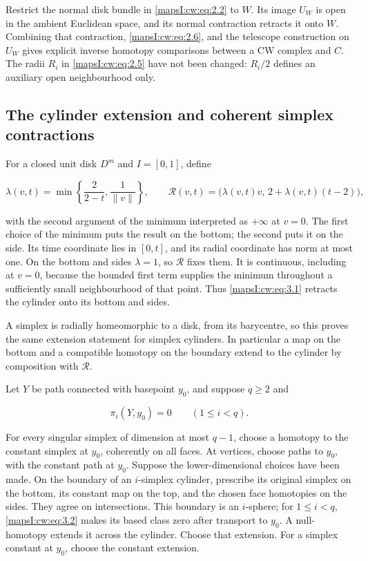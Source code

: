 \documentclass[11pt]{article}
\begin{document}
Restrict the normal disk bundle in \eqref{mapsI:cw:eq:2.2} to \(W\). Its image \(U_W\) is open in the ambient Euclidean space, and its normal contraction retracts it onto \(W\). Combining that contraction, \eqref{mapsI:cw:eq:2.6}, and the telescope construction on \(U_W\) gives explicit inverse homotopy comparisons between a CW complex and \(C\). The radii \(R_i\) in \eqref{mapsI:cw:eq:2.5} have not been changed: \(R_i/2\) defines an auxiliary open neighbourhood only.

\subsection{The cylinder extension and coherent simplex contractions}
\label{mapsI:cw:hurewicz-coherent}

For a closed unit disk \(D^m\) and \(I=[0,1]\), define

\begin{equation}
\lambda(v,t)=\min\left\{\frac{2}{2-t},\frac1{\lVert v\rVert}\right\},
\qquad
\mathcal R(v,t)=\bigl(\lambda(v,t)v,\,2+\lambda(v,t)(t-2)\bigr),
\label{mapsI:cw:eq:3.1}
\end{equation}

with the second argument of the minimum interpreted as \(+\infty\) at \(v=0\). The first choice of the minimum puts the result on the bottom; the second puts it on the side. Its time coordinate lies in \([0,t]\), and its radial coordinate has norm at most one. On the bottom and sides \(\lambda=1\), so \(\mathcal R\) fixes them. It is continuous, including at \(v=0\), because the bounded first term supplies the minimum throughout a sufficiently small neighbourhood of that point. Thus \eqref{mapsI:cw:eq:3.1} retracts the cylinder onto its bottom and sides.

A simplex is radially homeomorphic to a disk, from its barycentre, so this proves the same extension statement for simplex cylinders. In particular a map on the bottom and a compatible homotopy on the boundary extend to the cylinder by composition with \(\mathcal R\).

Let \(Y\) be path connected with basepoint \(y_0\), and suppose \(q\geq2\) and

\begin{equation}
\pi_i(Y,y_0)=0\qquad(1\leq i<q).
\label{mapsI:cw:eq:3.2}
\end{equation}

For every singular simplex of dimension at most \(q-1\), choose a homotopy to the constant simplex at \(y_0\), coherently on all faces. At vertices, choose paths to \(y_0\), with the constant path at \(y_0\). Suppose the lower-dimensional choices have been made. On the boundary of an \(i\)-simplex cylinder, prescribe its original simplex on the bottom, its constant map on the top, and the chosen face homotopies on the sides. They agree on intersections. This boundary is an \(i\)-sphere; for \(1\leq i<q\), \eqref{mapsI:cw:eq:3.2} makes its based class zero after transport to \(y_0\). A null-homotopy extends it across the cylinder. Choose that extension. For a simplex constant at \(y_0\), choose the constant extension.
\end{document}
